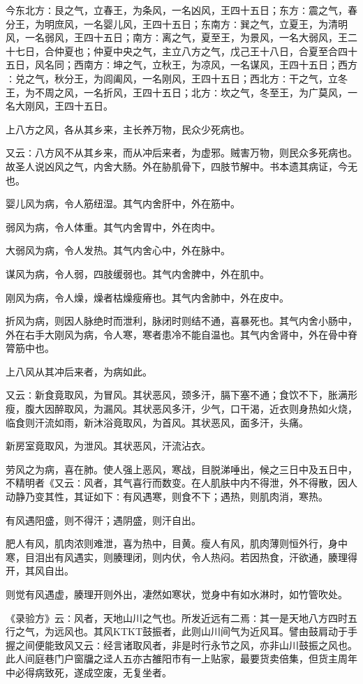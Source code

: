 \documentclass[a4paper,12pt,UTF8,twoside]{ctexbook}
\begin{document}
今东北方∶艮之气，立春王，为条风，一名凶风，王四十五日；东方∶震之气，春分王，为明庶风，一名婴儿风，王四十五日；东南方∶巽之气，立夏王，为清明风，一名弱风，王四十五日；南方∶离之气，夏至王，为景风，一名大弱风，王二十七日，合仲夏也；仲夏中央之气，主立八方之气，戊己王十八日，合夏至合四十五日，风名同；西南方∶坤之气，立秋王，为凉风，一名谋风，王四十五日；西方∶兑之气，秋分王，为闾阖风，一名刚风，王四十五日；西北方∶干之气，立冬王，为不周之风，一名折风，王四十五日；北方∶坎之气，冬至王，为广莫风，一名大刚风，王四十五日。

上八方之风，各从其乡来，主长养万物，民众少死病也。

又云∶八方风不从其乡来，而从冲后来者，为虚邪。贼害万物，则民众多死病也。故圣人说凶风之气，内舍大肠。外在胁肌骨下，四肢节解中。书本遗其病证，今无也。

婴儿风为病，令人筋纽湿。其气内舍肝中，外在筋中。

弱风为病，令人体重。其气内舍胃中，外在肉中。

大弱风为病，令人发热。其气内舍心中，外在脉中。

谋风为病，令人弱，四肢缓弱也。其气内舍脾中，外在肌中。

刚风为病，令人燥，燥者枯燥瘦瘠也。其气内舍肺中，外在皮中。

折风为病，则因人脉绝时而泄利，脉闭时则结不通，喜暴死也。其气内舍小肠中，外在右手大刚风为病，令人寒，寒者患冷不能自温也。其气内舍肾中，外在骨中脊膂筋中也。

上八风从其冲后来者，为病如此。

又云∶新食竟取风，为冒风。其状恶风，颈多汗，膈下塞不通；食饮不下，胀满形瘦，腹大因醉取风，为漏风。其状恶风多汗，少气，口干渴，近衣则身热如火烧，临食则汗流如雨，新沐浴竟取风，为首风。其状恶风，面多汗，头痛。

新房室竟取风，为泄风。其状恶风，汗流沾衣。

劳风之为病，喜在肺。使人强上恶风，寒战，目脱涕唾出，候之三日中及五日中，不精明者《又云∶风者，其气喜行而数变。在人肌肤中内不得泄，外不得散，因人动静乃变其性，其证如下∶有风遇寒，则食不下；遇热，则肌肉消，寒热。

有风遇阳盛，则不得汗；遇阴盛，则汗自出。

肥人有风，肌肉浓则难泄，喜为热中，目黄。瘦人有风，肌肉薄则恒外行，身中寒，目泪出有风遇实，则腠理闭，则内伏，令人热闷。若因热食，汗欲通，腠理得开，其风自出。

则觉有风遇虚，腠理开则外出，凄然如寒状，觉身中有如水淋时，如竹管吹处。

《录验方》云∶风者，天地山川之气也。所发近远有二焉∶其一是天地八方四时五行之气，为远风也。其风KTKT鼓振者，此则山川间气为近风耳。譬由鼓肩动于手握之间便能致风又云∶经言诸取风者，非是时行永节之风，亦非山川鼓振之风也。此人间庭巷门户窗牖之迳人五亦古雒阳市有一上贴家，最要货卖倍集，但货主周年中必得病致死，遂成空废，无复坐者。
\end{document}
